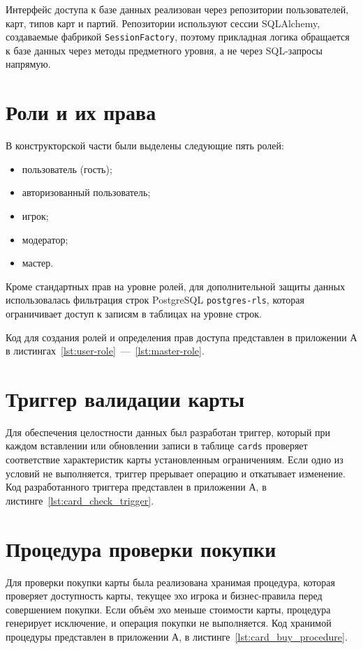 Интерфейс доступа к базе данных реализован через репозитории пользователей,
карт, типов карт и партий. Репозитории используют сессии SQLAlchemy,
создаваемые фабрикой \texttt{SessionFactory}, поэтому прикладная логика
обращается к базе данных через методы предметного уровня, а не через
SQL-запросы напрямую.
\clearpage

\section{Роли и их права}
В конструкторской части были выделены следующие пять ролей:
\begin{itemize}
	\item пользователь (гость);
	\item авторизованный пользователь;
	\item игрок;
	\item модератор;
	\item мастер.
\end{itemize}

Кроме стандартных прав на уровне ролей, для дополнительной защиты данных
использовалась фильтрация строк PostgreSQL \texttt{postgres-rls}, которая
ограничивает доступ к записям в таблицах на уровне строк.

Код для создания ролей и определения прав доступа представлен в приложении А в
листингах~\ref{lst:user-role}~---~\ref{lst:master-role}.

\section{Триггер валидации карты}

Для обеспечения целостности данных был разработан триггер, который при каждом
вставлении или обновлении записи в таблице \texttt{cards} проверяет
соответствие характеристик карты установленным ограничениям. Если одно из
условий не выполняется, триггер прерывает операцию и откатывает изменение.
Код разработанного триггера представлен в приложении А, в
листинге~\ref{lst:card_check_trigger}.

\section{Процедура проверки покупки}

Для проверки покупки карты была реализована хранимая процедура, которая
проверяет доступность карты, текущее эхо игрока и бизнес-правила перед
совершением покупки. Если объём эхо меньше стоимости карты, процедура
генерирует исключение, и операция покупки не выполняется.
Код хранимой процедуры представлен в приложении А, в
листинге~\ref{lst:card_buy_procedure}.

